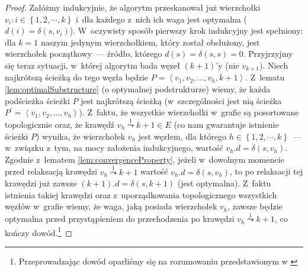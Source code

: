 \begin{proof}
Załóżmy indukcyjnie, że algorytm przeskanował już wierzchołki $v_{i} : i \in \left\{ 1, 2, \cdots, k \right\}$ i~dla każdego z~nich ich waga jest optymalna ($d \left( i \right) = \delta \left( s, v_{i} \right)$). W~oczywisty sposób pierwszy krok indukcyjny jest spełniony: dla $k = 1$ naszym jedynym wierzchołkiem, który został obsłużony, jest wierzchołek początkowy~--- źródło, którego $d \left( s \right) = \delta \left( s, s \right) = 0$. Przyjrzyjmy się teraz sytuacji, w~której algorytm bada węzeł $\left(k+1\right)$'y (nie $v_{k+1}$). Niech najkrótszą ścieżką do tego węzła będzie $P = \left \langle v_{1}, v_{2}, \ldots, v_{h}, k+1 \right \rangle $. Z~lematu \ref{lem:optimalSubstructure} (o optymalnej podstrukturze) wiemy, że każda podścieżka ścieżki $P$ jest najkrótszą ścieżką (w~szczególności jest nią ścieżka $P^{'} = \left \langle v_{1}, v_{2}, \ldots, v_{h} \right \rangle $). Z~faktu, że wszystkie wierzchołki w~grafie są posortowane topologicznie oraz, że krawędź $v_{h} \overset{1}\leadsto k+1 \in E$ (co nam gwarantuje istnienie ścieżki $P$) wynika, że wierzchołek $v_{h}$ jest węzłem, dla którego $h \in \left\{ 1, 2, \cdots, k \right\}$~--- w~związku z~tym, na mocy założenia indukcyjnego, wartość $v_{h}.d = \delta \left( s, v_{h} \right)$. Zgodnie z~lematem \ref{lem:convergenceProperty}, jeżeli w~dowolnym momencie przed relaksacją krawędzi $v_{h} \overset{1}\leadsto k+1$ wartość $v_{h}.d = \delta \left( s, v_{h} \right)$, to po relaksacji tej krawędzi już zawsze $ \left( k+1 \right).d = \delta \left( s, k+1 \right) $ (jest optymalna). Z~faktu istnienia takiej krawędzi oraz z~uporządkowania topologicznego wszystkich węzłów w~grafie wiemy, że waga, jaką posiada wierzchołek $v_{h}$, zawsze będzie optymalna przed przystąpieniem do przechodzenia po krawędzi $v_{h} \overset{1}\leadsto k+1$, co kończy dowód.\footnote{Przeprowadzając dowód oparliśmy się na rozumowaniu przedstawionym w \cite[$4.4$]{Ahuja:1993:NFT:137406}}
\end{proof}


